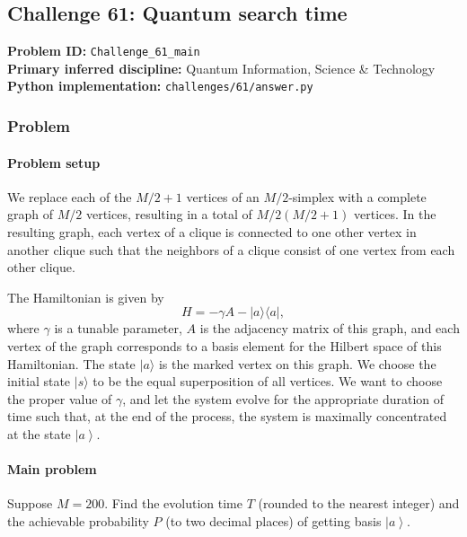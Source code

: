 \subsection[Challenge 61: Quantum search time]{Challenge 61: Quantum search time}
\textbf{Problem ID:} \texttt{Challenge\_61\_main}\\
\textbf{Primary inferred discipline:} Quantum Information, Science \& Technology\\
\textbf{Python implementation:} \texttt{challenges/61/answer.py}

\subsubsection*{Problem}
\paragraph*{Problem setup}
We replace each of the $M/2+1$ vertices of an $M/2$-simplex with
a complete graph of $M/2$ vertices, resulting in a total of $M/2(M/2+1)$ vertices.
{\color{blue}In the resulting graph, each vertex of a clique is connected to one other vertex in another clique such that the neighbors of a clique consist of one vertex from each other clique.}

The Hamiltonian is given by
\begin{equation}
H=-\gamma A-|a\rangle\langle a|,
\end{equation}
where $\gamma$ is a tunable parameter, $A$ is the adjacency matrix of this graph, and each vertex of the graph corresponds to a basis {\color{blue}element} for {\color{blue}the Hilbert space of} this Hamiltonian. The state $|a\rangle$ is the marked vertex on this graph. We choose the initial state $|s\rangle$ to be the equal superposition of all vertices. We want to choose the proper value of $\gamma$, and let the system evolve for the appropriate duration of time such that, at the end of the process, the system is maximally concentrated at the state $\left|a\right\rangle$.

\paragraph*{Main problem}

Suppose $M=200$. Find the evolution time $T$ (rounded to the nearest integer) and the achievable probability $P$ (to two decimal places) of getting basis $\left|a\right\rangle$.
